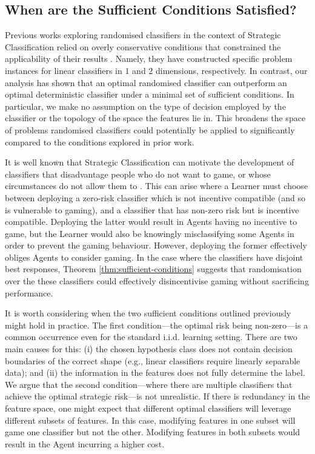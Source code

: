 \subsection{When are the Sufficient Conditions Satisfied?}
\label{sec:when_sufficient}
Previous works exploring randomised classifiers in the context of Strategic Classification relied on overly conservative conditions that constrained the applicability of their results \citep{braverman2020, sundaram2023}. Namely, they have constructed specific problem instances for linear classifiers in $1$ and $2$ dimensions, respectively. In contrast, our analysis has shown that an optimal randomised classifier can outperform an optimal deterministic classifier under a minimal set of sufficient conditions. In particular, we make no assumption on the type of decision employed by the classifier or the topology of the space the features lie in. This broadens the space of problems randomised classifiers could potentially be applied to significantly compared to the conditions explored in prior work.

It is well known that Strategic Classification can motivate the development of classifiers that disadvantage people who do not want to game, or whose circumstances do not allow them to \cite{milli2019, hu2019}. This can arise where a Learner must choose between deploying a zero-risk classifier which is not incentive compatible (and so is vulnerable to gaming), and a classifier that has non-zero risk but is incentive compatible. Deploying the latter would result in Agents having no incentive to game, but the Learner would also be knowingly misclassifying some Agents in order to prevent the gaming behaviour. However, deploying the former effectively obliges Agents to consider gaming. In the case where the classifiers have disjoint best responses, Theorem \ref{thm:sufficient-conditions} suggests that randomisation over the these classifiers could effectively disincentivise gaming without sacrificing performance.

It is worth considering when the two sufficient conditions outlined previously might hold in practice. The first condition---the optimal risk being non-zero---is a common occurrence even for the standard i.i.d. learning setting. There are two main causes for this: (i) the chosen hypothesis class does not contain decision boundaries of the correct shape (e.g., linear classifiers require linearly separable data); and (ii) the information in the features does not fully determine the label. We argue that the second condition---where there are multiple classifiers that achieve the optimal strategic risk---is not unrealistic. If there is redundancy in the feature space, one might expect that different optimal classifiers will leverage different subsets of features. In this case, modifying features in one subset will game one classifier but not the other. Modifying features in both subsets would result in the Agent incurring a higher cost.

